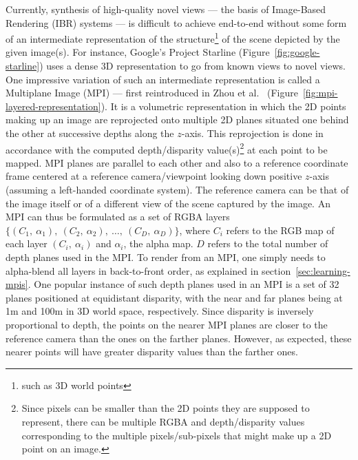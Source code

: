 Currently, synthesis of high-quality novel views --- the basis of Image-Based Rendering (IBR) systems --- is difficult to achieve end-to-end without some form of an intermediate representation of the structure\footnote{such as 3D world points} of the scene depicted by the given image(s). For instance, Google's Project Starline (Figure~\ref{fig:google-starline}) uses a dense 3D representation to go from known views to novel views. One impressive variation of such an intermediate representation is called a Multiplane Image (MPI) --- first reintroduced in Zhou et al.~\cite{zhou2018stereo} (Figure~\ref{fig:mpi-layered-representation}). It is a volumetric representation in which the 2D points making up an image are reprojected onto multiple 2D planes situated one behind the other at successive depths along the $z$-axis. This reprojection is done in accordance with the computed depth/disparity value(s)\footnote{Since pixels can be smaller than the 2D points they are supposed to represent, there can be multiple RGBA and depth/disparity values corresponding to the multiple pixels/sub-pixels that might make up a 2D point on an image.} at each point to be mapped. MPI planes are parallel to each other and also to a reference coordinate frame centered at a reference camera/viewpoint looking down positive $z$-axis (assuming a left-handed coordinate system). The reference camera can be that of the image itself or of a different view of the scene captured by the image. An MPI can thus be formulated as a set of RGBA layers $\{(C_1,\ \alpha_1),\ (C_2,\ \alpha_2),\ \ldots,\ (C_D,\ \alpha_D)\}$, where $C_i$ refers to the RGB map of each layer $(C_i,\ \alpha_i)$ and $\alpha_i$, the alpha map. $D$ refers to the total number of depth planes used in the MPI. To render from an MPI, one simply needs to alpha-blend all layers in back-to-front order, as explained in section~\ref{sec:learning-mpis}. One popular instance of such depth planes used in an MPI is a set of 32 planes positioned at equidistant disparity, with the near and far planes being at 1m and 100m in 3D world space, respectively. Since disparity is inversely proportional to depth, the points on the nearer MPI planes are closer to the reference camera than the ones on the farther planes. However, as expected, these nearer points will have greater disparity values than the farther ones.


